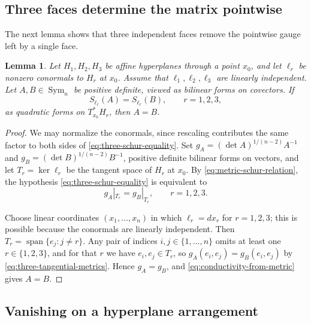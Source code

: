 \documentclass[10pt,a4paper]{amsart}
\newtheorem{lemma}[theorem]{Lemma}
\newcommand{\Sym}{\operatorname{Sym}}
\begin{document}
\subsection{Three faces determine the matrix pointwise}

The next lemma shows that three independent faces remove the pointwise gauge
left by a single face.

\begin{lemma}
\label{lem:three-schur-pointwise}
Let \(H_1,H_2,H_3\) be affine hyperplanes through a point \(x_0\), and let
\(\ell_r\) be nonzero conormals to \(H_r\) at \(x_0\).  Assume that
\(\ell_1,\ell_2,\ell_3\) are linearly independent.  Let \(A,B\in \Sym_n\) be
positive definite, viewed as bilinear forms on covectors.  If
\begin{equation}
  S_{\ell_r}(A)=S_{\ell_r}(B),\qquad r=1,2,3,
  \label{eq:three-schur-equality}
\end{equation}
as quadratic forms on \(T^*_{x_0}H_r\), then \(A=B\).
\end{lemma}

\begin{proof}
We may normalize the conormals, since rescaling contributes the same factor to
both sides of \eqref{eq:three-schur-equality}.  Set
\(g_A=(\det A)^{1/(n-2)}A^{-1}\) and
\(g_B=(\det B)^{1/(n-2)}B^{-1}\), positive definite bilinear forms on vectors,
and let \(T_r=\ker\ell_r\) be the tangent space of \(H_r\) at \(x_0\).  By
\eqref{eq:metric-schur-relation}, the hypothesis
\eqref{eq:three-schur-equality} is equivalent to
\begin{equation}
  g_A|_{T_r}=g_B|_{T_r},\qquad r=1,2,3.
  \label{eq:three-tangential-metrics}
\end{equation}

Choose linear coordinates
\((x_1,\ldots,x_n)\) in which \(\ell_r=dx_r\) for \(r=1,2,3\); this is possible
because the conormals are linearly independent.  Then
\(T_r=\operatorname{span}\{e_j:j\ne r\}\).  Any pair of indices
\(i,j\in\{1,\ldots,n\}\) omits at least one \(r\in\{1,2,3\}\), and for that
\(r\) we have \(e_i,e_j\in T_r\), so
\(g_A(e_i,e_j)=g_B(e_i,e_j)\) by \eqref{eq:three-tangential-metrics}.  Hence
\(g_A=g_B\), and \eqref{eq:conductivity-from-metric} gives \(A=B\).
\end{proof}


\subsection{Vanishing on a hyperplane arrangement}
\end{document}
